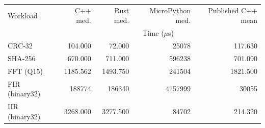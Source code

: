 \begin{tabular}{@{}lrrrr@{}}
\toprule
Workload & C++ med. & Rust med. & MicroPython med. & Published C++ mean \\
 & \multicolumn{4}{c}{Time (\(\mu\)s)} \\
\midrule
CRC-32 & 104.000 & 72.000 & 25078 & 117.630 \\
SHA-256 & 670.000 & 711.000 & 596238 & 701.090 \\
FFT (Q15) & 1185.562 & 1493.750 & 241504 & 1821.500 \\
FIR (binary32) & 188774 & 186340 & 4157999 & 30055 \\
IIR (binary32) & 3268.000 & 3277.500 & 84702 & 214.320 \\
\bottomrule
\end{tabular}
